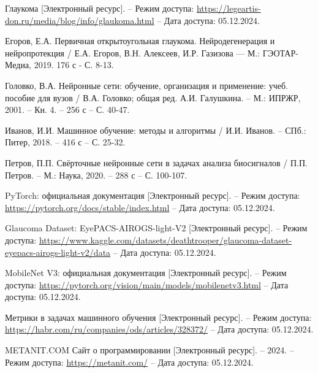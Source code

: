 {    
    
    \clearpage
    
\begin{thebibliography}{99}
    Глаукома [Электронный ресурс]. – Режим доступа: \url{https://legeartis-don.ru/media/blog/info/glaukoma.html} – Дата доступа: 05.12.2024.

    Егоров, Е.А. Первичная открытоугольная глаукома. Нейродегенерация и нейропротекция / Е.А. Егоров, В.Н. Алексеев, И.Р. Газизова — М.: ГЭОТАР-Медиа, 2019. 176 с - С. 8-13.
    
    Головко, В.А. Нейронные сети: обучение, организация и применение: учеб. пособие для вузов / В.А. Головко; общая ред. А.И. Галушкина. – М.: ИПРЖР, 2001. – Кн. 4. – 256 с – С. 40-47.
    
    Иванов, И.И. Машинное обучение: методы и алгоритмы / И.И. Иванов. – СПб.: Питер, 2018. – 416 с – С. 25-32.

    Петров, П.П. Свёрточные нейронные сети в задачах анализа биосигналов / П.П. Петров. – М.: Наука, 2020. – 288 с – С. 100-107.
    
    PyTorch: официальная документация [Электронный ресурс]. – Режим доступа: \url{https://pytorch.org/docs/stable/index.html} – Дата доступа: 05.12.2024.
    
    Glaucoma Dataset: EyePACS-AIROGS-light-V2 [Электронный ресурс]. – Режим доступа: \url{https://www.kaggle.com/datasets/deathtrooper/glaucoma-dataset-eyepacs-airogs-light-v2/data} – Дата доступа: 05.12.2024.

    MobileNet V3: официальная документация [Электронный ресурс]. – Режим доступа: \url{https://pytorch.org/vision/main/models/mobilenetv3.html} – Дата доступа: 05.12.2024.
    
    Метрики в задачах машинного обучения [Электронный ресурс]. – Режим доступа: \url{https://habr.com/ru/companies/ods/articles/328372/} – Дата доступа: 05.12.2024.
    
    METANIT.COM Сайт о программировании [Электронный ресурс]. – 2024. – Режим доступа: \url{https://metanit.com/} – Дата доступа: 05.12.2024.

    \end{thebibliography}
}


